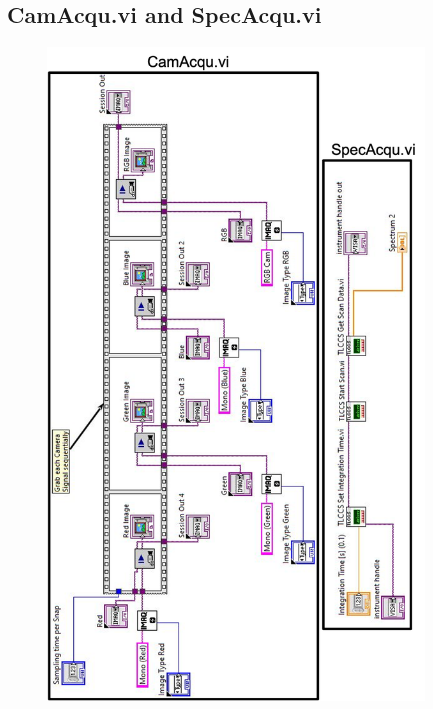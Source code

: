 \subsection{CamAcqu.vi and SpecAcqu.vi}
\begin{figure}[h]
\begin{center}
\includegraphics[width=10cm]{Pictures/AppAcquvi}
\end{center}
\end{figure}

\newpage
